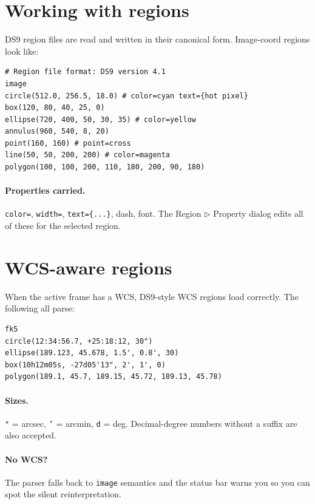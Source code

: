 \documentclass[11pt,a4paper]{article}
\begin{document}
\section{Working with regions}

DS9 region files are read and written in their canonical form. Image-coord
regions look like:

\begin{lstlisting}
# Region file format: DS9 version 4.1
image
circle(512.0, 256.5, 18.0) # color=cyan text={hot pixel}
box(120, 80, 40, 25, 0)
ellipse(720, 400, 50, 30, 35) # color=yellow
annulus(960, 540, 8, 20)
point(160, 160) # point=cross
line(50, 50, 200, 200) # color=magenta
polygon(100, 100, 200, 110, 180, 200, 90, 180)
\end{lstlisting}

\paragraph{Properties carried.} \texttt{color=}, \texttt{width=},
\texttt{text=\{...\}}, dash, font. The Region $\triangleright$ Property
dialog edits all of these for the selected region.

\section{WCS-aware regions}

When the active frame has a WCS, DS9-style WCS regions load correctly. The
following all parse:

\begin{lstlisting}
fk5
circle(12:34:56.7, +25:18:12, 30")
ellipse(189.123, 45.678, 1.5', 0.8', 30)
box(10h12m05s, -27d05'13", 2', 1', 0)
polygon(189.1, 45.7, 189.15, 45.72, 189.13, 45.78)
\end{lstlisting}

\paragraph{Sizes.} \texttt{"} = arcsec, \texttt{'} = arcmin, \texttt{d} =
deg. Decimal-degree numbers without a suffix are also accepted.

\paragraph{No WCS?} The parser falls back to \texttt{image} semantics and
the status bar warns you so you can spot the silent reinterpretation.
\end{document}

